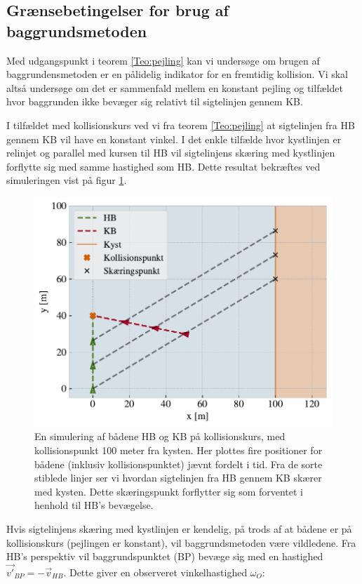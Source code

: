 \documentclass[%
 reprint,
nofootinbib,
aps,
]{revtex4-1}
\begin{document}
 \subsection{Grænsebetingelser for brug af baggrundsmetoden}
 Med udgangspunkt i teorem \ref{Teo:pejling} kan vi undersøge om brugen af baggrundensmetoden er en pålidelig indikator for en fremtidig kollision. Vi skal altså undersøge om det er sammenfald mellem en konstant pejling og tilfældet hvor baggrunden ikke bevæger sig relativt til sigtelinjen gennem KB. \par
 I tilfældet med kollisionskurs ved vi fra teorem \ref{Teo:pejling} at sigtelinjen fra HB gennem KB vil have en konstant vinkel. I det enkle tilfælde hvor kystlinjen er relinjet og parallel med kursen til HB vil sigtelinjens skæring med kystlinjen forflytte sig med samme hastighed som HB. Dette resultat bekræftes ved simuleringen vist på figur \ref{fig:eks1}.
 \begin{figure}[H]
   \includegraphics[width=\linewidth]{figures/eksempel1.pdf}
   \caption{En simulering af bådene HB og KB på kollisionskurs, med kollisionspunkt 100 meter fra kysten. Her plottes fire positioner for bådene (inklusiv kollisionspunktet) jævnt fordelt i tid. Fra de sorte stiblede linjer ser vi hvordan sigtelinjen fra HB gennem KB skærer med kysten. Dette skæringspunkt forflytter sig som forventet i henhold til HB's bevægelse.}
   \label{fig:eks1}
 \end{figure}
 Hvis sigtelinjens skæring med kystlinjen er kendelig, på trods af at bådene er på kollisionskurs (pejlingen er konstant), vil baggrundsmetoden være vildledene. Fra HB's perspektiv vil baggrundspunktet (BP) bevæge sig med en hastighed $\vec{v'}_{BP} = - \vec{v}_{HB}$. Dette giver en observeret vinkelhastighed $\omega_O$:
\end{document}
